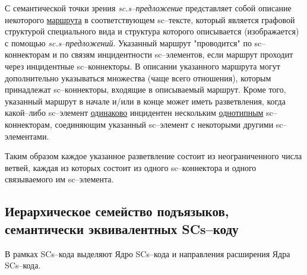 
С семантической точки зрения \textit{sc.s--предложение} представляет собой описание некоторого \uline{маршрута} в соответствующем sc--тексте, который является графовой структурой специального вида и структура которого описывается (изображается) с помощью \textit{sc.s--предложений}. Указанный маршрут "проводится"{} по sc--коннекторам и по связям инцидентности sc--элементов, если маршрут проходит через инцидентные sc--коннекторы. В описании указанного маршрута могут дополнительно указываться множества (чаще всего отношения), которым принадлежат sc--коннекторы, входящие в описываемый маршрут. Кроме того, указанный маршрут в начале и/или в конце может иметь разветвления, когда какой--либо sc--элемент \uline{одинаково} инцидентен нескольким \uline{однотипным} sc--коннекторам, соединяющим указанный sc--элемент с некоторыми другими sc--элементами.

Таким образом каждое указанное разветвление состоит из неограниченного числа ветвей, каждая из которых состоит из одного sc--коннектора и одного связываемого им sc--элемента.


\subsection{Иерархическое семейство подъязыков, семантически эквивалентных SCs--коду}

В рамках SCs--кода выделяют Ядро SCs--кода и направления расширения Ядра SCs--кода.

\begin{SCn}
\end{SCn}

